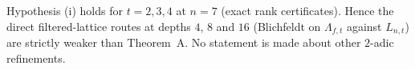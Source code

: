 Hypothesis (i) holds for $t=2,3,4$ at $n=7$ (exact rank certificates). Hence the direct filtered-lattice routes at depths $4$, $8$ and $16$ (Blichfeldt on $\Lambda_{f,t}$ against $L_{n,t}$) are strictly weaker than Theorem~A. No statement is made about other $2$-adic refinements.
